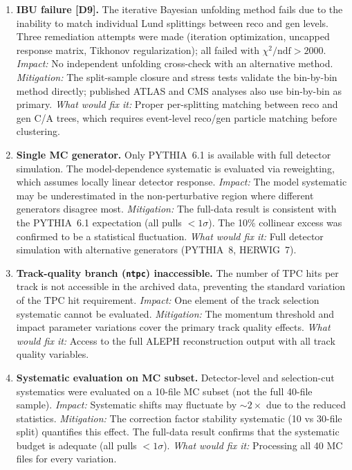 \documentclass[11pt,a4paper]{article}
\begin{document}
\begin{enumerate}
\item \textbf{IBU failure [D9].}  The iterative Bayesian unfolding
  method fails due to the inability to match individual Lund splittings
  between reco and gen levels.  Three remediation attempts were made
  (iteration optimization, uncapped response matrix, Tikhonov
  regularization); all failed with $\chi^2/\text{ndf} > 2000$.
  \emph{Impact:} No independent unfolding cross-check with an
  alternative method.  \emph{Mitigation:} The split-sample closure and
  stress tests validate the bin-by-bin method directly; published ATLAS
  and CMS analyses also use bin-by-bin as primary.
  \emph{What would fix it:} Proper per-splitting matching between reco
  and gen C/A trees, which requires event-level reco/gen particle
  matching before clustering.

\item \textbf{Single MC generator.}  Only PYTHIA~6.1 is available with
  full detector simulation.  The model-dependence systematic is
  evaluated via reweighting, which assumes locally linear detector
  response.  \emph{Impact:} The model systematic may be underestimated
  in the non-perturbative region where different generators disagree
  most.  \emph{Mitigation:} The full-data result is consistent with
  the PYTHIA~6.1 expectation (all pulls $< 1\sigma$).  The 10\%
  collinear excess was confirmed to be a statistical fluctuation.
  \emph{What would fix it:} Full detector simulation with alternative
  generators (PYTHIA~8, HERWIG~7).

\item \textbf{Track-quality branch (\texttt{ntpc}) inaccessible.}  The
  number of TPC hits per track is not accessible in the archived data,
  preventing the standard variation of the TPC hit requirement.
  \emph{Impact:} One element of the track selection systematic cannot be
  evaluated.  \emph{Mitigation:} The momentum threshold and impact
  parameter variations cover the primary track quality effects.
  \emph{What would fix it:} Access to the full ALEPH reconstruction
  output with all track quality variables.

\item \textbf{Systematic evaluation on MC subset.}  Detector-level
  and selection-cut systematics were evaluated on a 10-file MC subset
  (not the full 40-file sample).
  \emph{Impact:} Systematic shifts may fluctuate by $\sim\!2\times$ due
  to the reduced statistics.  \emph{Mitigation:} The correction factor
  stability systematic (10 vs 30-file split) quantifies this effect.
  The full-data result confirms that the systematic budget is adequate
  (all pulls $< 1\sigma$).
  \emph{What would fix it:} Processing all 40 MC files for every
  variation.


\end{enumerate}
\end{document}
